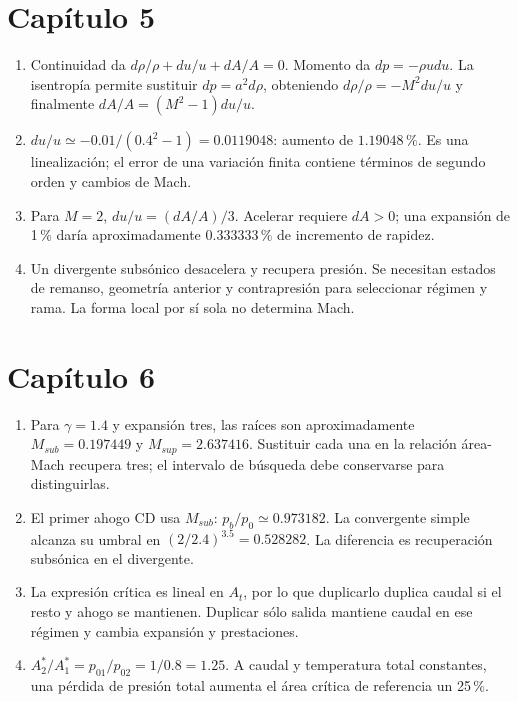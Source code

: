 \section*{Capítulo 5}
\begin{enumerate}
\item Continuidad da $d\rho/\rho+du/u+dA/A=0$. Momento da $dp=-\rho udu$. La isentropía permite sustituir $dp=a^2d\rho$, obteniendo $d\rho/\rho=-M^2du/u$ y finalmente $dA/A=(M^2-1)du/u$.
\item $du/u\simeq-0.01/(0.4^2-1)=0.0119048$: aumento de $1.19048\,\%$. Es una linealización; el error de una variación finita contiene términos de segundo orden y cambios de Mach.
\item Para $M=2$, $du/u=(dA/A)/3$. Acelerar requiere $dA>0$; una expansión de 1\,\% daría aproximadamente $0.333333\,\%$ de incremento de rapidez.
\item Un divergente subsónico desacelera y recupera presión. Se necesitan estados de remanso, geometría anterior y contrapresión para seleccionar régimen y rama. La forma local por sí sola no determina Mach.
\end{enumerate}
\section*{Capítulo 6}
\begin{enumerate}
\item Para $\gamma=1.4$ y expansión tres, las raíces son aproximadamente $M_{sub}=0.197449$ y $M_{sup}=2.637416$. Sustituir cada una en la relación área-Mach recupera tres; el intervalo de búsqueda debe conservarse para distinguirlas.
\item El primer ahogo CD usa $M_{sub}$: $p_b/p_0\simeq0.973182$. La convergente simple alcanza su umbral en $(2/2.4)^{3.5}=0.528282$. La diferencia es recuperación subsónica en el divergente.
\item La expresión crítica es lineal en $A_t$, por lo que duplicarlo duplica caudal si el resto y ahogo se mantienen. Duplicar sólo salida mantiene caudal en ese régimen y cambia expansión y prestaciones.
\item $A^*_2/A^*_1=p_{01}/p_{02}=1/0.8=1.25$. A caudal y temperatura total constantes, una pérdida de presión total aumenta el área crítica de referencia un 25\,\%.
\end{enumerate}

